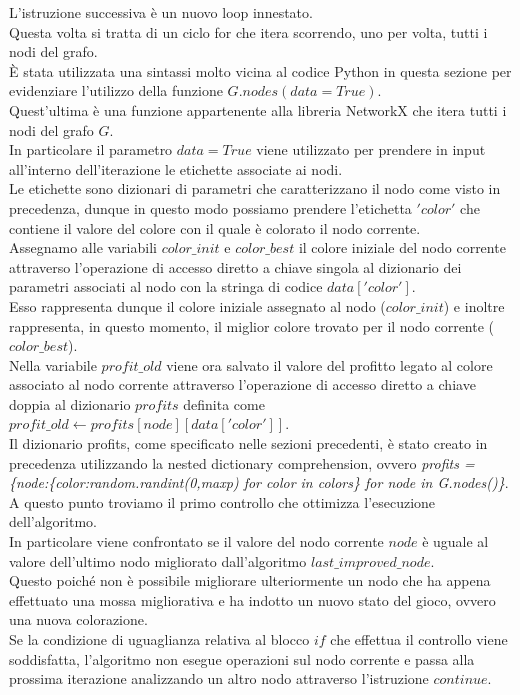 L'istruzione successiva è un nuovo loop innestato.\\ Questa volta si tratta di un ciclo for che itera scorrendo, uno per volta, tutti i nodi del grafo.\\
È stata utilizzata una sintassi molto vicina al codice Python in questa sezione per evidenziare l'utilizzo della funzione $G.nodes(data=True)$.\\
Quest'ultima è una funzione appartenente alla libreria NetworkX che itera tutti i nodi del grafo $G$.\\
In particolare il parametro $data=True$ viene utilizzato per prendere in input all'interno dell'iterazione le etichette associate ai nodi.\\
Le etichette sono dizionari di parametri che caratterizzano il nodo come visto in precedenza, dunque in questo modo possiamo prendere l'etichetta $'color'$ che contiene il valore del colore con il quale è colorato il nodo corrente.\\

Assegnamo alle variabili $color\_init$ e $color\_best$ il colore iniziale del nodo corrente attraverso l'operazione di accesso diretto a chiave singola al dizionario dei parametri associati al nodo con la stringa di codice $data['color']$.\\
Esso rappresenta dunque il colore iniziale assegnato al nodo ($color\_init$) e inoltre rappresenta, in questo momento, il miglior colore trovato per il nodo corrente ($color\_best$).\\

Nella variabile $profit\_old$ viene ora salvato il valore del profitto legato al colore associato al nodo corrente attraverso l'operazione di accesso diretto a chiave doppia al dizionario $profits$ definita come $profit\_old\gets profits[node][data['color']]$.\\
Il dizionario profits, come specificato nelle sezioni precedenti, è stato creato in precedenza utilizzando la nested dictionary comprehension, ovvero \textit{profits = \{node:\{color:random.randint(0,maxp) for color in colors\} for node in G.nodes()\}}.\\

A questo punto troviamo il primo controllo che ottimizza l'esecuzione dell'algoritmo.\\
In particolare viene confrontato se il valore del nodo corrente $node$ è uguale al valore dell'ultimo nodo migliorato dall'algoritmo $last\_improved\_node$.\\
Questo poiché non è possibile migliorare ulteriormente un nodo che ha appena effettuato una mossa migliorativa e ha indotto un nuovo stato del gioco, ovvero una nuova colorazione.\\
Se la condizione di uguaglianza relativa al blocco $if$ che effettua il controllo viene soddisfatta, l'algoritmo non esegue operazioni sul nodo corrente e passa alla prossima iterazione analizzando un altro nodo attraverso l'istruzione $continue$.\\

